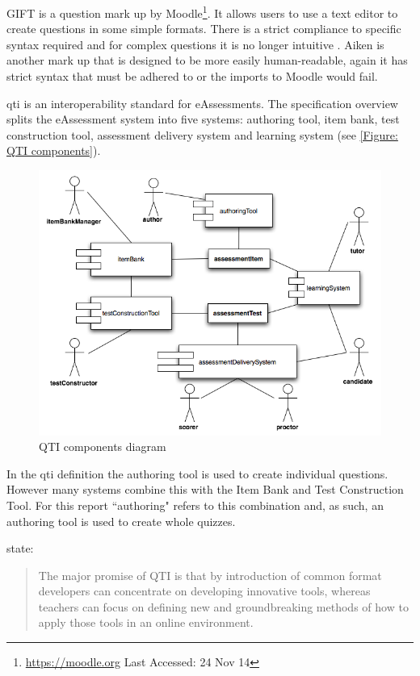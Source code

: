 GIFT is a question mark up by Moodle\footnote{\url{https://moodle.org} Last Accessed: 24 Nov 14}. It allows users to use a text editor to create questions in some simple formats. There is a strict compliance to specific syntax required and for complex questions it is no longer intuitive \citep{failQTI}. Aiken is another mark up that is designed to be more easily human-readable, again it has strict syntax that must be adhered to or the imports to Moodle would fail.

\gls{qti} is an interoperability standard for \glspl{eAssessment}. The specification overview \citep{qtiOverview} splits the \gls{eAssessment} system into five systems: authoring tool, item bank, test construction tool, assessment delivery system and learning system (see \autoref{Figure: QTI components}).

\begin{figure}[h]
	\centering 
		\includegraphics[scale=0.3]{../figures/componentsQTI.png} 		
	\caption{\label{Figure: QTI components} QTI components diagram \citep{qtiOverview}} 	
\end{figure}

In the \gls{qti} definition the authoring tool is used to create individual questions. However many systems combine this with the Item Bank and Test Construction Tool. For this report ``\gls{authoring}" refers to this combination and, as such, an authoring tool is used to create whole quizzes.

\cite{wikieassessment} state:
\begin{quote}
The major promise of QTI is that by introduction of common format developers can concentrate on developing innovative tools, whereas teachers can focus on defining new and groundbreaking methods of how to apply those tools in an online environment.
\end{quote}

